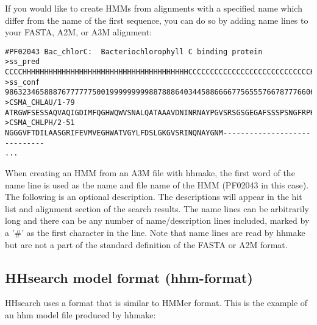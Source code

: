 \documentclass[11pt,a4paper]{article}
\begin{document}
If you would like to create HMMs from alignments with a specified name which differ 
from the name of the first sequence, you can do so by adding name lines to 
your FASTA, A2M, or A3M alignment:

\scriptsize\begin{verbatim}
#PF02043 Bac_chlorC:  Bacteriochlorophyll C binding protein
>ss_pred
CCCCHHHHHHHHHHHHHHHHHHHHHHHHHHHHHHHHHHHHHHCCCCCCCCCCCCCCCCCCCCCCCCCCCCHHHHHHHCC
>ss_conf
9863234658887677777750019999999998878886403445886666775655576678777660667633039
>CSMA_CHLAU/1-79
ATRGWFSESSAQVAQIGDIMFQGHWQWVSNALQATAAAVDNINRNAYPGVSRSGSGEGAFSSSPSNGFRPKRIRSRFNR
>CSMA_CHLPH/2-51
NGGGVFTDILAASGRIFEVMVEGHWATVGYLFDSLGKGVSRINQNAYGNM-----------------------------
...
\end{verbatim}\normalsize

When creating an HMM from an A3M file with hhmake, the first word of the name line is 
used as the name and file name of the HMM (PF02043 in this case). The following is an 
optional description. The descriptions will appear in the hit list and alignment section 
of the search results. The name lines can be arbitrarily long and there can be any number of 
name/description lines included, marked by a '\#' as the first character in the line. 
Note that name lines are read by hhmake but are not a part of the standard definition
of the FASTA or A2M format.
 

\subsection{HHsearch model format (hhm-format)}

HHsearch uses a format that is similar to HMMer format. This is the example of an hhm model file produced by hhmake:
\end{document}
